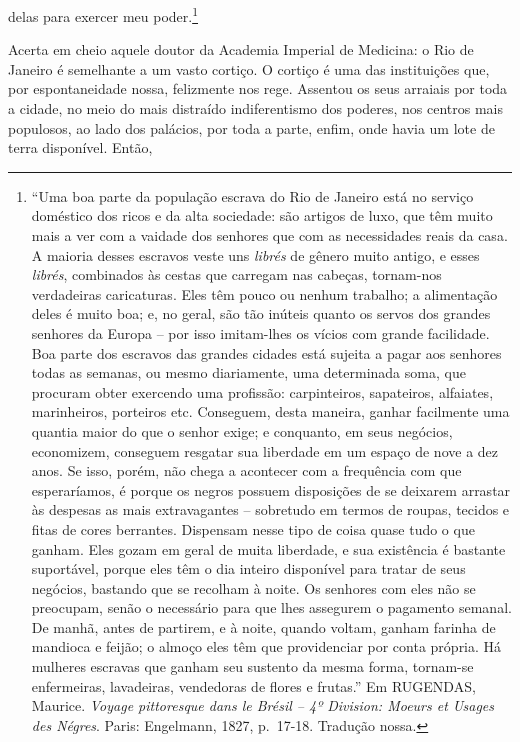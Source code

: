delas para exercer meu poder.\footnote{``Uma boa parte da população
  escrava do Rio de Janeiro está no serviço doméstico dos ricos e da
  alta sociedade: são artigos de luxo, que têm muito mais a ver com a
  vaidade dos senhores que com as necessidades reais da casa. A maioria
  desses escravos veste uns \emph{librés} de gênero muito antigo, e
  esses \emph{librés}, combinados às cestas que carregam nas cabeças,
  tornam-nos verdadeiras caricaturas. Eles têm pouco ou nenhum trabalho;
  a alimentação deles é muito boa; e, no geral, são tão inúteis quanto
  os servos dos grandes senhores da Europa -- por isso imitam-lhes os
  vícios com grande facilidade. Boa parte dos escravos das grandes
  cidades está sujeita a pagar aos senhores todas as semanas, ou mesmo
  diariamente, uma determinada soma, que procuram obter exercendo uma
  profissão: carpinteiros, sapateiros, alfaiates, marinheiros, porteiros
  etc. Conseguem, desta maneira, ganhar facilmente uma quantia maior do
  que o senhor exige; e conquanto, em seus negócios, economizem,
  conseguem resgatar sua liberdade em um espaço de nove a dez anos. Se
  isso, porém, não chega a acontecer com a frequência com que
  esperaríamos, é porque os negros possuem disposições de se deixarem
  arrastar às despesas as mais extravagantes -- sobretudo em termos de
  roupas, tecidos e fitas de cores berrantes. Dispensam nesse tipo de
  coisa quase tudo o que ganham. Eles gozam em geral de muita liberdade,
  e sua existência é bastante suportável, porque eles têm o dia inteiro
  disponível para tratar de seus negócios, bastando que se recolham à
  noite. Os senhores com eles não se preocupam, senão o necessário para
  que lhes assegurem o pagamento semanal. De manhã, antes de partirem, e
  à noite, quando voltam, ganham farinha de mandioca e feijão; o almoço
  eles têm que providenciar por conta própria. Há mulheres escravas que
  ganham seu sustento da mesma forma, tornam-se enfermeiras, lavadeiras,
  vendedoras de flores e frutas.'' Em RUGENDAS, Maurice. \emph{Voyage
  pittoresque dans le Brésil -- 4º Division: Moeurs et Usages des
  Négres}. Paris: Engelmann, 1827, p.~17-18. Tradução nossa.}

Acerta em cheio aquele doutor da Academia Imperial de Medicina: o Rio de
Janeiro é semelhante a um vasto cortiço. O cortiço é uma das
instituições que, por espontaneidade nossa, felizmente nos rege.
Assentou os seus arraiais por toda a cidade, no meio do mais distraído
indiferentismo dos poderes, nos centros mais populosos, ao lado dos
palácios, por toda a parte, enfim, onde havia um lote de terra
disponível. Então,

